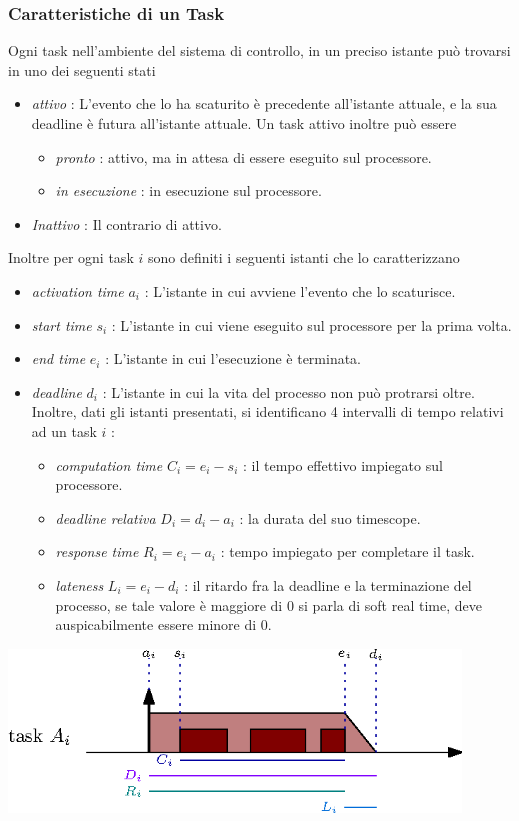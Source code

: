 \documentclass[10pt, letterpaper]{report}
\begin{document}
\subsubsection{Caratteristiche di un Task}
Ogni task nell'ambiente del sistema di controllo, in un preciso istante può trovarsi in uno dei seguenti stati\begin{itemize}
    \item \textit{attivo} : L'evento che lo ha scaturito è precedente all'istante attuale, e la sua deadline è futura 
    all'istante attuale. Un task attivo inoltre può essere \begin{itemize}
        \item \textit{pronto} : attivo, ma in attesa di essere eseguito sul processore. 
        \item \textit{in esecuzione} : in esecuzione sul processore.
    \end{itemize} 
    \item \textit{Inattivo} : Il contrario di attivo.
\end{itemize}
Inoltre per ogni task $i$ sono definiti i seguenti istanti che lo caratterizzano \begin{itemize}
    \item \textit{activation time}  $a_i$ : L'istante in cui avviene l'evento che lo scaturisce. 
    \item \textit{start time} $s_i$ : L'istante in cui viene eseguito sul processore per la prima volta. 
    \item \textit{end time} $e_i$ : L'istante in cui l'esecuzione è terminata. 
    \item \textit{deadline} $d_i$ : L'istante in cui la vita del processo non può protrarsi oltre.
    Inoltre, dati gli istanti presentati, si identificano 4 intervalli di tempo relativi ad un task $i$ :\begin{itemize}
        \item \textit{computation time}  $C_i = e_i-s_i$ : il tempo effettivo impiegato sul processore.  
        \item \textit{deadline relativa} $D_i=d_i-a_i$ : la durata del suo timescope.  
        \item \textit{response time} $R_i = e_i-a_i$ : tempo impiegato per completare il task.  
        \item \textit{lateness} $L_i=e_i-d_i$ : il ritardo fra la deadline e la terminazione del processo, se 
        tale valore è maggiore di 0 si parla di soft real time, deve auspicabilmente essere minore di 0. 
    \end{itemize}
\end{itemize}\begin{center}
    \includegraphics[width=0.9\textwidth ]{images/istantiDelTask.eps}
\end{center}
\end{document}

